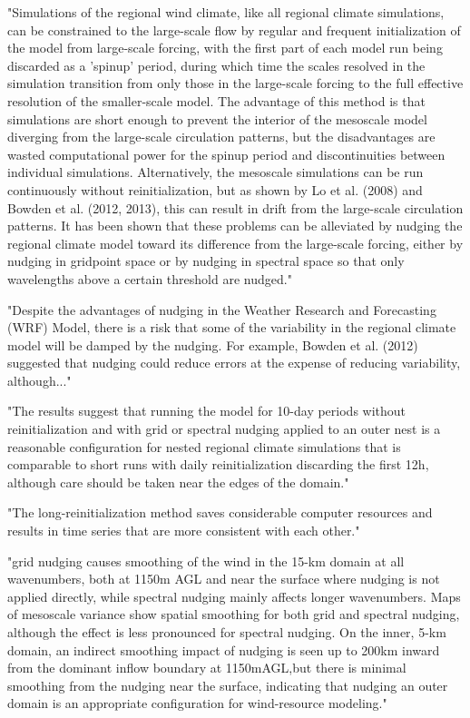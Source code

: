 \documentclass[12pt,a4paper]{article}
\begin{document}
"Simulations of the regional wind climate, like all regional climate simulations, can be constrained to the large-scale flow by regular and frequent initialization of the model from large-scale forcing, with the first part of each model run being discarded as a 'spinup’ period, during which time the scales resolved in the simulation transition from only those in the large-scale forcing to the full effective resolution of the smaller-scale model. The advantage of this method is that simulations are short enough to prevent the interior of the mesoscale model diverging from the large-scale circulation patterns, but the disadvantages are wasted computational power for the spinup period and discontinuities between individual simulations. Alternatively, the mesoscale simulations can be run continuously without reinitialization, but as shown by Lo et al. (2008) and Bowden et al. (2012, 2013), this can result in drift from the large-scale circulation patterns. It has been shown that these problems can be alleviated by nudging the regional climate model toward its difference from the large-scale forcing, either by nudging in gridpoint space or by nudging in spectral space so that only wavelengths above a certain threshold are nudged."

"Despite the advantages of nudging in the Weather Research and Forecasting (WRF) Model, there is a risk that some of the variability in the regional climate model will be damped by the nudging. For example, Bowden et al. (2012) suggested that nudging could reduce errors at the expense of reducing variability, although..."

"The results suggest that running the model for 10-day periods without reinitialization and with grid or spectral nudging applied to an outer nest is a reasonable configuration for nested regional climate simulations that is comparable to short runs with daily reinitialization discarding the first 12h, although care should be taken near the edges of the domain."

"The long-reinitialization method saves considerable computer resources and results in time series that are more consistent with each other."

"grid nudging causes smoothing of the wind in the 15-km domain at all wavenumbers, both at 1150m AGL and near the surface where nudging is not applied directly, while spectral nudging mainly affects longer wavenumbers. Maps of mesoscale variance show spatial smoothing for both grid and spectral nudging, although the effect is less pronounced for spectral nudging. On the inner, 5-km domain, an indirect smoothing impact of nudging is seen up to 200km inward from the dominant inflow boundary at 1150mAGL,but there is minimal smoothing from the nudging near the surface, indicating that nudging an outer domain is an appropriate configuration for wind-resource modeling."
\end{document}
